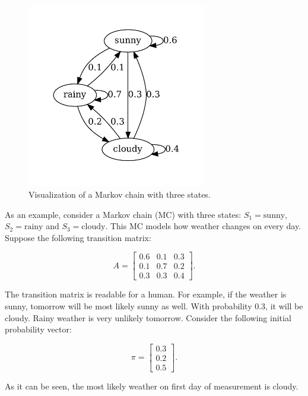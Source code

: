 \documentclass[thesis=B,english]{FITthesis}[2012/06/26]
\begin{document}
\begin{figure}
	\centering
 	\includegraphics[width=0.7\textwidth]{mc}
 	\caption{Visualization of a Markov chain with three states.}
 	\label{fig:mc}
\end{figure}

As an example, consider a Markov chain (MC) with three states: $S_1 = \text{sunny}$, $S_2 = \text{rainy}$ and $S_3 = \text{cloudy}$. This MC models how weather changes on every day. Suppose the following transition matrix:

\begin{equation*}
A =
\begin{bmatrix}
	0.6	& 0.1 & 0.3 \\
	0.1 & 0.7 & 0.2 \\
	0.3 & 0.3 & 0.4
\end{bmatrix}.
\end{equation*}

The transition matrix is readable for a human. For example, if the weather is sunny, tomorrow will be most likely sunny as well. With probability 0.3, it will be cloudy. Rainy weather is very unlikely tomorrow. Consider the following initial probability vector:

\begin{equation*}
\pi = \begin{bmatrix} 0.3 \\ 0.2 \\ 0.5 \end{bmatrix}.
\end{equation*}

As it can be seen, the most likely weather on first day of measurement is cloudy.
\end{document}
